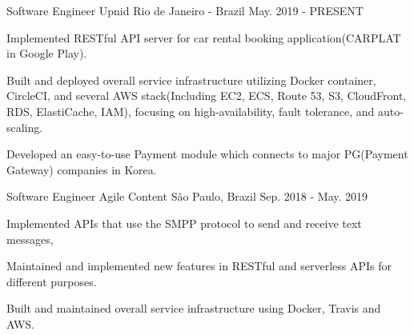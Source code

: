 

\begin{cventries}

  \cventry
    {Software Engineer} %
    {Upnid} %
    {Rio de Janeiro - Brazil} %
    {May. 2019 - PRESENT} %
    {
      \begin{cvitems} %
        \item {Implemented RESTful API server for car rental booking application(CARPLAT in Google Play).}
        \item {Built and deployed overall service infrastructure utilizing Docker container, CircleCI, and several AWS stack(Including EC2, ECS, Route 53, S3, CloudFront, RDS, ElastiCache, IAM), focusing on high-availability, fault tolerance, and auto-scaling.}
        \item {Developed an easy-to-use Payment module which connects to major PG(Payment Gateway) companies in Korea.}
      \end{cvitems}
    }

  \cventry
    {Software Engineer} %
    {Agile Content} %
    {São Paulo, Brazil} %
    {Sep. 2018 - May. 2019} %
    {
      \begin{cvitems} %
        \item {Implemented APIs that use the SMPP protocol to send and receive text messages,}
        \item {Maintained and implemented new features in RESTful and serverless APIs for different purposes.}
        \item {Built and maintained overall service infrastructure using Docker, Travis and AWS.}
      \end{cvitems}
    }


\end{cventries}
